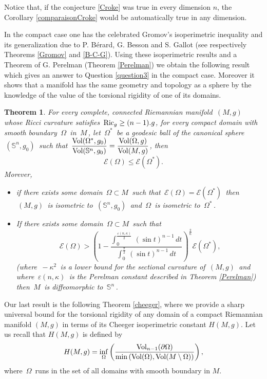 \documentclass[11pt, reqno]{amsart}
\newtheorem{theoreme}{Theorem}[section]
\theoremstyle{plain}
\begin{document}
Notice that, if the conjecture \ref{Croke} was true in every dimension $n$, the Corollary \ref{comparaisonCroke} would be automatically true in any dimension.

In the compact  case one has the celebrated Gromov's isoperimetric inequality and 
its generalization due to  P. B\'erard, G. Besson and S. Gallot  (see respectively Theorems \ref{Gromov} and  \ref{B-C-G}).
Using these isoperimetric results  and a Theorem of G. Perelman (Theorem \ref{Perelman})  we obtain the following result 
which gives an answer to Question \ref{question3} in the compact case.
Moreover it shows  that a manifold has the same geometry and topology as a sphere by the knowledge of the value of the torsional
rigidity of one of its domains.

\begin{theoreme}\label{compsphere2}
For every complete, connected Riemannian manifold $\,(M,g)\,$ whose Ricci
curvature satisfies $\,{\rm Ric}_g \ge (n-1).g$, for every compact domain with smooth boundary 
$\,\Omega \,$ in $\, M \,$, let $\,\Omega^*\,$ be a geodesic ball of  the canonical sphere 
$\, (\mathbb S^n , g_0 )\,$ such that 
$\,\dfrac{{\rm Vol} (\Omega^*, g_0)}{{\rm Vol} (\mathbb S^n , g_0 )} 
= \dfrac{{\rm Vol} (\Omega , g )}{{\rm Vol} (M , g )}$, 
then 
$${\mathcal E} (\Omega) \le {\mathcal E} (\Omega^*).$$
Morever, 
\begin{itemize}
\item [(i)] 
if there exists some domain $\,\Omega \subset M\,$ such that $\,{\mathcal E} (\Omega) = 
{\mathcal E} (\Omega^*)\,$  then $\, (M, g) \,$ is isometric to $\,(\mathbb S^n , g_0 )\,$ and
$\,\Omega\,$ is isometric to $\,\Omega^*\,$.
\item [(ii)] If there exists some domain $\,\Omega \subset M\,$ such that 
$$\,{\mathcal E} (\Omega) >
 \left( 1 - \dfrac{\int_0^{\frac{\varepsilon (n , \kappa)}{2}}\, (\sin t)^{n-1}\, dt}
{\int_0^{\frac{\pi}{2}}\, (\sin t)^{n-1}\, dt}\right)^{\frac{2}{n}}{\mathcal E} (\Omega^*),$$
(where $\,-\kappa^2\,$ is a lower bound for the sectional curvature of $\,(M,g)\,$ and where
$\,\varepsilon (n , \kappa)\,$ is the Perelman constant  described in Theorem \ref{Perelman})
then $\, M \,$ is diffeomorphic to $\,\mathbb S^n \,$.
\end{itemize}
\end{theoreme}

Our last result is the following  Theorem \ref{cheeger}, where we provide  a sharp universal bound for the torsional rigidity of any domain of a compact Riemannian manifold  $(M, g)$ in terms of its Cheeger  isoperimetric constant  $H(M, g)$.  Let us recall that  $H(M,g)$  is defined by 
$$H(M,g) = \inf_\Omega \left( \dfrac{{\rm Vol}_{n-1} (\partial \Omega)}{\min \left({\rm Vol} (\Omega),
{\rm Vol} (M \setminus \Omega)\right)}\right),$$
where $\,\Omega\,$ runs in the set of all domains with smooth boundary in $M$. 
\end{document}
